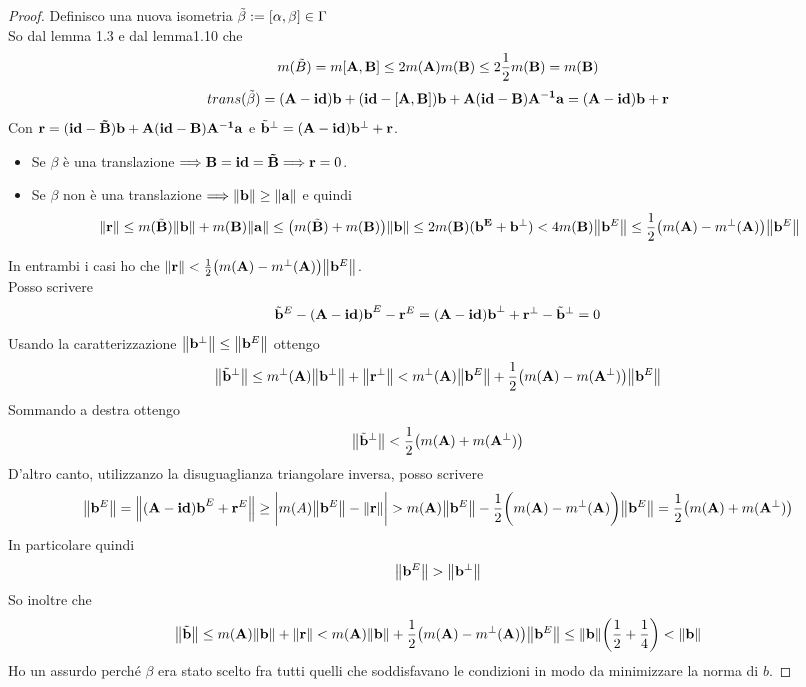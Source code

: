\documentclass[10pt,a4paper]{book}
\begin{document}
\begin{proof}
\begin{minipage}{0.5\textwidth}
\end{minipage}
Definisco una nuova isometria $ \tilde{\beta} := [\vb{\alpha,\beta}] \in \Gamma$  \\
So dal lemma 1.3 e dal lemma1.10 che
\[ m(\tilde{B} ) = m[\vb{A,B}] \leq 2m(\vb{A}) m(\vb{B}) \leq 2 \frac{1}{2}m(\vb{B}) = m(\vb{B}) \]
\[ trans( \tilde{\beta}) = \vb{(A-id)b + (id-[A,B])b + A(id-B)A^{-1}a} = \vb{(A-id)b + r}\]
Con $\vb{r} = \vb{(id-\tilde{B})b + A(id-B)A^{-1}a}$ e $\tilde{\vb{b}}^{\perp} =  \vb{(A-id)b^{\perp} + r}$.
\begin{itemize}
\item Se $\beta$  è una translazione $\Longrightarrow \vb{B = id = \tilde{B}} \Longrightarrow \vb{r} = 0$. 
\item Se $\beta$ non è una translazione $\Longrightarrow \norm{\vb{b}} \geq \norm{\vb{a}}$  e quindi \\
\[ \norm{\vb{r}} \leq m(\tilde{\vb{B}}) \norm{\vb{b}} + m(\vb{B}) \norm{\vb{a}} \leq \big( m(\tilde{\vb{B}}) + m(\vb{B}) \big) \norm{\vb{b}} \leq 2m(\vb{B})(\vb{b^{E}+ b^{\perp}}) < 4 m(\vb{B}) \norm{\vb{b}^{E}} \leq \frac{1}{2} \big( m(\vb{A}) - m^{\perp}(\vb{A}) \big)\norm{\vb{b}^{E}} \]
\end{itemize}
In entrambi i casi ho che $\norm{\vb{r}} < \frac{1}{2} \big( m(\vb{A}) - m^{\perp}(\vb{A}) \big)\norm{\vb{b}^{E}}$. \\
Posso scrivere 
\[ \tilde{\vb{b}}^{E} -(\vb{A-id) b}^{E} - \vb{r}^{E} = (\vb{A-id) b}^{\perp} + \vb{r}^{\perp} - \tilde{\vb{b}}^{\perp} = 0 \]
Usando la caratterizzazione $\norm{\vb{b}^{\perp}} \leq \norm{\vb{b}^E}$  ottengo
\[ \norm{\tilde{\vb{b}}^{\perp}} \leq  m^{\perp}(\vb{A}) \norm{\vb{b}^{\perp}} + \norm{\vb{r}^{\perp}} < m^{\perp}(\vb{A}) \norm{\vb{b}^{E}} + \frac{1}{2} \big( m(\vb{A}) - m(\vb{A}^{\perp}) \big)\norm{\vb{b}^{E}}  \] 
Sommando a destra ottengo
\[ \norm{\tilde{\vb{b}}^{\perp}} < \frac{1}{2} \big( m(\vb{A}) + m(\vb{A}^{\perp}) \big) \]
D'altro canto, utilizzanzo la disuguaglianza triangolare inversa, posso scrivere
\[ \norm{\vb{b}^{E}} = \norm{(\vb{A-id) b}^{E} + \vb{r}^{E}} \geq \bigg| m(A) \norm{\vb{b}^E} - \norm{\vb{r}}\bigg| > m(\vb{A}) \norm{\vb{b}^E} - \frac{1}{2} \bigg( m(\vb{A}) - m^{\perp}(\vb{A})\bigg)\norm{\vb{b}^E} =  \frac{1}{2} \big( m(\vb{A}) + m(\vb{A}^{\perp}) \big)\]
In particolare quindi 
\[ \norm{\vb{b}^{E}} > \norm{\vb{b}^{\perp}}\]
So inoltre che 
\[ \norm{\tilde{\vb{b}}} \leq m(\vb{A}) \norm{\vb{b}} + \norm{\vb{r}} < m(\vb{A})\norm{\vb{b}} + \frac{1}{2} \big( m(\vb{A}) - m^{\perp}(\vb{A}) \big)\norm{\vb{b}^{E}} \leq  \norm{\vb{b}} \bigg( \frac{1}{2} + \frac{1}{4}\bigg) < \norm{\vb{b}} \]
Ho un assurdo perché $\beta$ era stato scelto fra tutti quelli che soddisfavano le condizioni in modo da minimizzare la norma di $b$.


\end{proof}
\end{document}
